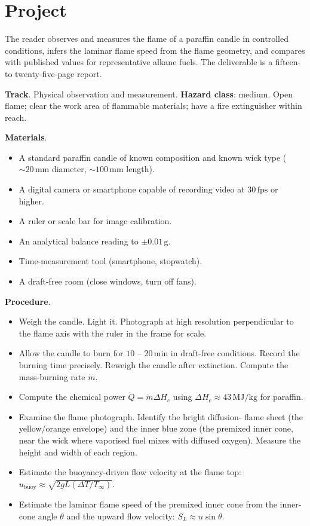 \section{Project}

\begin{project}
The reader observes and measures the flame of a paraffin candle in
controlled conditions, infers the laminar flame speed from the flame
geometry, and compares with published values for representative
alkane fuels. The deliverable is a fifteen- to twenty-five-page report.

\textbf{Track}. Physical observation and measurement.
\textbf{Hazard class}: medium. Open flame; clear the work area of
flammable materials; have a fire extinguisher within reach.

\textbf{Materials}.

\begin{itemize}[leftmargin=*]
\item A standard paraffin candle of known composition and known wick
  type ($\sim 20\,\text{mm}$ diameter, $\sim 100\,\text{mm}$ length).
\item A digital camera or smartphone capable of recording video at
  $30\,\text{fps}$ or higher.
\item A ruler or scale bar for image calibration.
\item An analytical balance reading to $\pm 0.01\,\text{g}$.
\item Time-measurement tool (smartphone, stopwatch).
\item A draft-free room (close windows, turn off fans).
\end{itemize}

\textbf{Procedure}.

\begin{itemize}[leftmargin=*]
\item Weigh the candle. Light it. Photograph at high resolution
  perpendicular to the flame axis with the ruler in the frame for
  scale.
\item Allow the candle to burn for $10$ -- $20\,\text{min}$ in
  draft-free conditions. Record the burning time precisely. Reweigh
  the candle after extinction. Compute the mass-burning rate
  $\dot{m}$.
\item Compute the chemical power $\dot{Q} = \dot{m} \Delta H_c$
  using $\Delta H_c \approx 43\,\text{MJ}/\text{kg}$ for paraffin.
\item Examine the flame photograph. Identify the bright diffusion-
  flame sheet (the yellow/orange envelope) and the inner blue zone
  (the premixed inner cone, near the wick where vaporised fuel mixes
  with diffused oxygen). Measure the height and width of each region.
\item Estimate the buoyancy-driven flow velocity at the flame top:
  $u_{\text{buoy}} \approx \sqrt{2 g L (\Delta T / T_{\infty})}$.
\item Estimate the laminar flame speed of the premixed inner cone
  from the inner-cone angle $\theta$ and the upward flow velocity:
  $S_L \approx u \sin\theta$.
\end{itemize}


\end{project}
